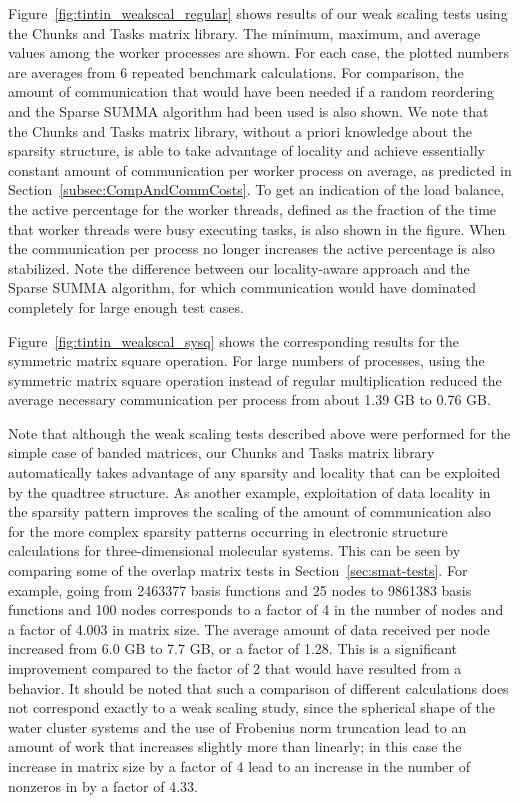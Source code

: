 \documentclass{elsarticle}
\begin{document}
Figure~\ref{fig:tintin_weakscal_regular} shows results of our weak
scaling tests using the Chunks and Tasks matrix library.  The minimum,
maximum, and average values among the worker processes are shown. For
each case, the plotted numbers are averages from 6 repeated benchmark
calculations.  For comparison, the amount of communication that would
have been needed if a random reordering and the Sparse SUMMA algorithm
had been used is also shown.  We note that the Chunks and Tasks matrix
library, without a priori knowledge about the sparsity structure, is
able to take advantage of locality and achieve essentially constant
amount of communication per worker process on average, as predicted in
Section~\ref{subsec:CompAndCommCosts}.  To get an indication of the
load balance, the active percentage for the worker threads, defined as
the fraction of the time that worker threads were busy executing
tasks, is also shown in the figure.  When the communication per
process no longer increases the active percentage is also
stabilized. Note the difference between our locality-aware approach
and the Sparse SUMMA algorithm, for which communication would have
dominated completely for large enough test cases.

Figure~\ref{fig:tintin_weakscal_sysq} shows the corresponding results
for the symmetric matrix square operation. For large numbers of
processes, using the symmetric matrix square operation instead of
regular multiplication reduced the average necessary communication per process
from about 1.39 GB to 0.76 GB.


Note that although the weak scaling tests described above were
performed for the simple case of banded matrices, our Chunks and Tasks
matrix library automatically takes advantage of any sparsity and
locality that can be exploited by the quadtree structure.
As another example, exploitation of data locality in the
sparsity pattern improves the scaling of the amount of communication
also for the more complex sparsity patterns occurring in electronic
structure calculations for three-dimensional molecular systems. This can be seen by comparing some of the
overlap matrix tests in Section~\ref{sec:smat-tests}. For example,
going from 2463377 basis functions and 25 nodes to 9861383 basis
functions and 100 nodes corresponds to a factor of 4 in the number of
nodes and a factor of 4.003 in matrix size. The average amount of
data received per node increased from 6.0 GB to 7.7 GB, or a factor of
1.28. This is a significant improvement compared to the factor of 2
that would have resulted from a  behavior.
It should be noted that such a comparison of different 
calculations does not correspond exactly to a weak scaling study,
since the spherical shape of the water cluster systems and the use of Frobenius norm truncation lead to an amount of
work that increases slightly more than linearly; in this case the increase
in matrix size by a factor of 4 lead to an increase in the number of
nonzeros in  by a factor of 4.33.
\end{document}
